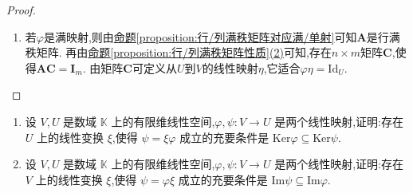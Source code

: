 \documentclass[../../main.tex]{subfiles}
\begin{document}
\begin{proof}
\begin{enumerate}[(1)]
\item 若\(\varphi\)是满映射,则由\hyperref[proposition:行/列满秩矩阵对应满/单射]{命题\ref{proposition:行/列满秩矩阵对应满/单射}}可知\(\boldsymbol{A}\)是行满秩矩阵. 再由\hyperref[proposition:行/列满秩矩阵性质]{命题\ref{proposition:行/列满秩矩阵性质}(2)}可知,存在\(n\times m\)矩阵\(\boldsymbol{C}\),使得\(\boldsymbol{A}\boldsymbol{C}=\boldsymbol{I}_m\). 由矩阵\(\boldsymbol{C}\)可定义从\(U\)到\(V\)的线性映射\(\eta\),它适合\(\varphi\eta=\text{Id}_U\).
\end{enumerate}

\end{proof}

\begin{proposition}\label{proposition:核空间和值域与线性映射}
\begin{enumerate}[(1)]
\item 设 \(V,U\) 是数域 \(\mathbb{K}\) 上的有限维线性空间,\(\varphi,\psi:V\to U\) 是两个线性映射,证明:存在 \(U\) 上的线性变换 \(\xi\),使得 \(\psi = \xi\varphi\) 成立的充要条件是 \(\text{Ker}\varphi\subseteq\text{Ker}\psi\).

\item 设 \(V,U\) 是数域 \(\mathbb{K}\) 上的有限维线性空间,\(\varphi,\psi:V\to U\) 是两个线性映射,证明:存在 \(V\) 上的线性变换 \(\xi\),使得 \(\psi = \varphi\xi\) 成立的充要条件是 \(\text{Im}\psi\subseteq\text{Im}\varphi\).
\end{enumerate}
\end{proposition}
\end{document}
